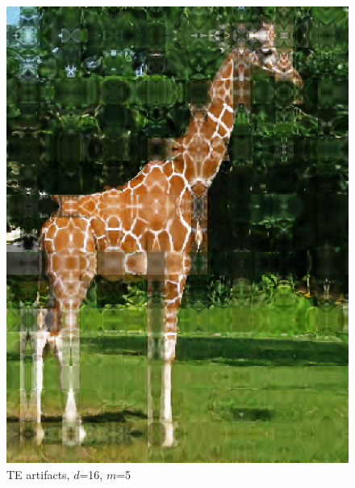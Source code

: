\begin{figure}[h]
\begin{minipage}[c]{.25\textwidth}
  \includegraphics[width=\textwidth]{Bilder/Giraffe/spiegelungen_image_result_tent12000_indim16_lr0.0125_m5.eps}
  \caption{TE artifacts, $d$=16, $m$=5}
  \label{TEartefact}
\end{minipage}

\end{figure}


